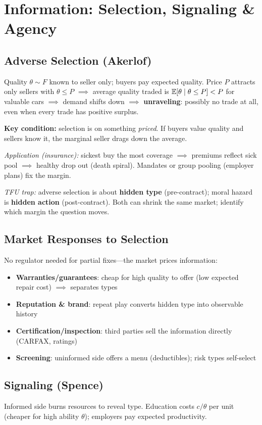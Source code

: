 \section{Information: Selection, Signaling \& Agency}

\subsection{Adverse Selection (Akerlof)}
Quality $\theta \sim F$ known to seller only; buyers pay expected quality. Price $P$ attracts only sellers with $\theta \leq P$ $\implies$ average quality traded is $\mathbb{E}[\theta \mid \theta \leq P] < P$ for valuable cars $\implies$ demand shifts down $\implies$ \textbf{unraveling}: possibly no trade at all, even when every trade has positive surplus.

\textbf{Key condition:} selection is on something \textit{priced}. If buyers value quality and sellers know it, the marginal seller drags down the average.

\textit{Application (insurance):} sickest buy the most coverage $\implies$ premiums reflect sick pool $\implies$ healthy drop out (death spiral). Mandates or group pooling (employer plans) fix the margin.

\textit{TFU trap:} adverse selection is about \textbf{hidden type} (pre-contract); moral hazard is \textbf{hidden action} (post-contract). Both can shrink the same market; identify which margin the question moves.

\subsection{Market Responses to Selection}
No regulator needed for partial fixes---the market prices information:
\begin{itemize}[nosep]
  \item \textbf{Warranties/guarantees}: cheap for high quality to offer (low expected repair cost) $\implies$ separates types
  \item \textbf{Reputation \& brand}: repeat play converts hidden type into observable history
  \item \textbf{Certification/inspection}: third parties sell the information directly (CARFAX, ratings)
  \item \textbf{Screening}: uninformed side offers a menu (deductibles); risk types self-select
\end{itemize}

\subsection{Signaling (Spence)}
Informed side burns resources to reveal type. Education costs $c/\theta$ per unit (cheaper for high ability $\theta$); employers pay expected productivity.

